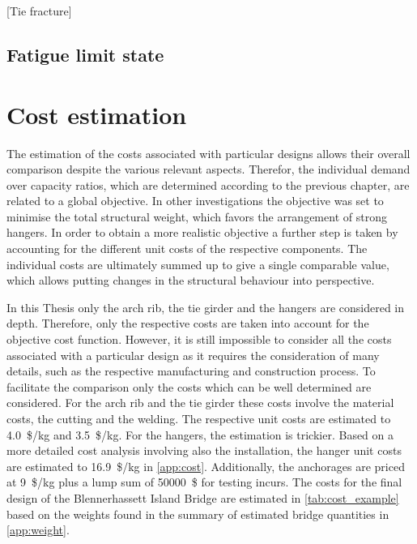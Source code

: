 [Tie fracture]

\subsection{Fatigue limit state}



\newpage
\section{Cost estimation} \label{sec:met_cost}
The estimation of the costs associated with particular designs allows their overall comparison despite the various relevant aspects. Therefor, the individual demand over capacity ratios, which are determined according to the previous chapter, are related to a global objective. In other investigations the objective was set to minimise the total structural weight, which favors the arrangement of strong hangers. In order to obtain a more realistic objective a further step is taken by accounting for the different unit costs of the respective components. The individual costs are ultimately summed up to give a single comparable value, which allows putting changes in the structural behaviour into perspective. \medskip

In this Thesis only the arch rib, the tie girder and the hangers are considered in depth. Therefore, only the respective costs are taken into account for the objective cost function. However, it is still impossible to consider all the costs associated with a particular design as it requires the consideration of many details, such as the respective manufacturing and construction process. To facilitate the comparison only the costs which can be well determined are considered. For the arch rib and the tie girder these costs involve the material costs, the cutting and the welding. The respective unit costs are estimated to \SI{4.0}{\$/kg} and \SI{3.5}{\$/kg}. For the hangers, the estimation is trickier. Based on a more detailed cost analysis involving also the installation, the hanger unit costs are estimated to \SI{16.9}{\$/kg} in \cref{app:cost}. Additionally, the anchorages are priced at \SI{9}{\$/kg} plus a lump sum of \SI{50000}{\$} for testing incurs. The costs for the final design of the Blennerhassett Island Bridge are estimated in \cref{tab:cost_example} based on the weights found in the summary of estimated bridge quantities in \cref{app:weight}.

